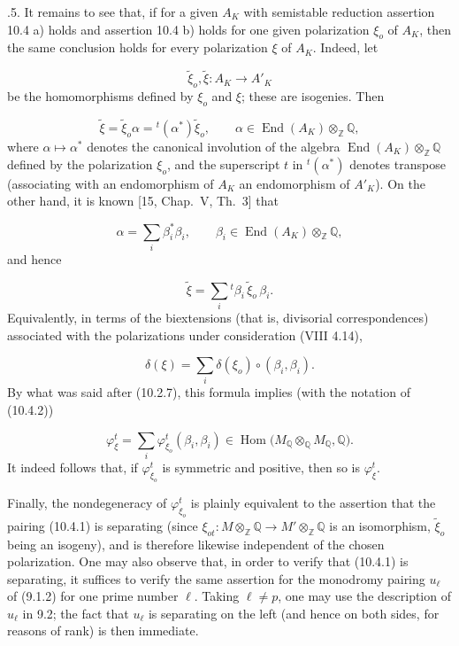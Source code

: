 \smallskip
{}.5. It remains to see that, if for a given $A_K$ with semistable
reduction assertion 10.4 a) holds and assertion 10.4 b) holds for one
given polarization $\xi_o$ of $A_K$, then the same conclusion holds for
every polarization $\xi$ of $A_K$. Indeed, let

\begin{equation*}
\widetilde\xi_o,\widetilde\xi:A_K\longrightarrow A'_K
\end{equation*}
be the homomorphisms defined by $\xi_o$ and $\xi$; these are isogenies.
Then

\begin{equation*}
\widetilde\xi=\widetilde\xi_o\alpha
 ={}^t(\alpha^*)\widetilde\xi_o,
 \qquad
\alpha\in\operatorname{End}(A_K)\otimes_{\mathbb Z}\mathbb Q,
\end{equation*}
where $\alpha\longmapsto\alpha^*$ denotes the canonical involution of
the algebra $\operatorname{End}(A_K)\otimes_{\mathbb Z}\mathbb Q$
defined by the polarization $\xi_o$, and the superscript $t$ in
${}^t(\alpha^*)$ denotes transpose (associating with an endomorphism of
$A_K$ an endomorphism of $A'_K$). On the other hand, it is known
[15, Chap.~V, Th.~3] that

\begin{equation*}
\alpha=\sum_i\beta_i^*\beta_i,
 \qquad
\beta_i\in\operatorname{End}(A_K)\otimes_{\mathbb Z}\mathbb Q,
\end{equation*}
and hence

\begin{equation*}
\widetilde\xi=\sum_i{}^t\beta_i\,\widetilde\xi_o\,\beta_i.
\end{equation*}
Equivalently, in terms of the biextensions (that is, divisorial
correspondences) associated with the polarizations under consideration
(VIII 4.14),

\begin{equation}\tag{10.5.5.1}
\delta(\xi)=\sum_i\delta(\xi_o)\circ(\beta_i,\beta_i).
\end{equation}
By what was said after (10.2.7), this formula implies (with the notation
of (10.4.2))

\begin{equation}\tag{10.5.5.2}
\varphi^t_\xi
 =\sum_i\varphi^t_{\xi_o}(\beta_i,\beta_i)
 \in\operatorname{Hom}
 \bigl(M_{\mathbb Q}\otimes_{\mathbb Q}M_{\mathbb Q},\mathbb Q\bigr).
\end{equation}
It indeed follows that, if $\varphi^t_{\xi_o}$ is symmetric and positive,
then so is $\varphi^t_\xi$.

Finally, the nondegeneracy of $\varphi^t_{\xi_o}$ is plainly equivalent
to the assertion that the pairing (10.4.1) is separating (since
$\xi_{ot}:M\otimes_{\mathbb Z}\mathbb Q
\longrightarrow M'\otimes_{\mathbb Z}\mathbb Q$ is an isomorphism,
$\widetilde\xi_o$ being an isogeny), and is therefore likewise
independent of the chosen polarization. One may also observe that, in
order to verify that (10.4.1) is separating, it suffices to verify the
same assertion for the monodromy pairing $u_\ell$ of (9.1.2) for one
prime number $\ell$. Taking $\ell\ne p$, one may use the description of
$u_\ell$ in 9.2; the fact that $u_\ell$ is separating on the left (and
hence on both sides, for reasons of rank) is then immediate.
